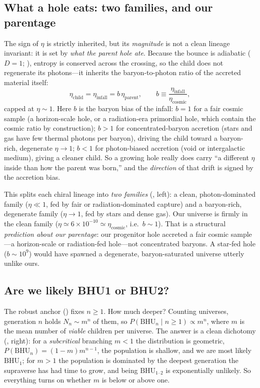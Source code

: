 \subsection{What a hole eats: two families, and our parentage}
\label{sec:accretion-eta}

The sign of $\eta$ is strictly inherited, but its \emph{magnitude} is not a clean
lineage invariant: it is set by \emph{what the parent hole ate}. Because the
bounce is adiabatic ($D=1$; ), entropy is conserved across the
crossing, so the child does not regenerate its photons---it inherits the
baryon-to-photon ratio of the accreted material itself:
\begin{equation}
  \eta_{\mathrm{child}} = \eta_{\mathrm{infall}} = b\,\eta_{\mathrm{parent}},
  \qquad b \equiv \frac{\eta_{\mathrm{infall}}}{\eta_{\mathrm{cosmic}}},
  \label{eq:eta-accretion}
\end{equation}
capped at $\eta\sim1$. Here $b$ is the baryon bias of the infall: $b=1$ for a fair
cosmic sample (a horizon-scale hole, or a radiation-era primordial hole, which
contain the cosmic ratio by construction); $b>1$ for concentrated-baryon
accretion (stars and gas have few thermal photons per baryon), driving the child
toward a baryon-rich, degenerate $\eta\to1$; $b<1$ for photon-biased accretion
(void or intergalactic medium), giving a cleaner child. So a growing hole really
does carry ``a different $\eta$ inside than how the parent was born,'' and the
\emph{direction} of that drift is signed by the accretion bias.

This splits each chiral lineage into \emph{two families}
(, left): a clean, photon-dominated family
($\eta\ll1$, fed by fair or radiation-dominated capture) and a baryon-rich,
degenerate family ($\eta\to1$, fed by stars and dense gas). Our universe is
firmly in the clean family ($\eta\simeq6\times10^{-10}\simeq\eta_{\mathrm{cosmic}}$,
i.e.\ $b\sim1$). That is a structural \emph{prediction about our parentage}: our
progenitor hole accreted a fair cosmic sample---a horizon-scale or radiation-fed
hole---not concentrated baryons. A star-fed hole ($b\sim10^{9}$) would have
spawned a degenerate, baryon-saturated universe utterly unlike ours.

\subsection{Are we likely BHU1 or BHU2?}
\label{sec:bhu-depth}

The robust anchor () fixes $n\ge1$. How much deeper? Counting
universes, generation $n$ holds $N_n\sim m^n$ of them, so
$P(\mathrm{BHU}_n\mid n\ge1)\propto m^n$, where $m$ is the mean number of
\emph{viable} children per universe. The answer is a clean dichotomy
(, right): for a \emph{subcritical} branching $m<1$ the
distribution is geometric, $P(\mathrm{BHU}_n)=(1-m)m^{n-1}$, the population is
shallow, and we are most likely $\mathrm{BHU}_1$; for $m>1$ the population is
dominated by the deepest generation the supraverse has had time to grow, and being
$\mathrm{BHU}_{1\text{--}2}$ is exponentially unlikely. So everything turns on
whether $m$ is below or above one.

